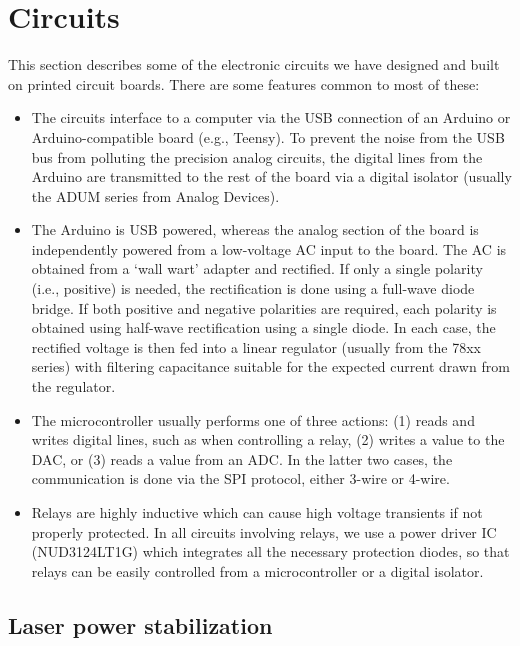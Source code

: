 \section{Circuits}

This section describes some of the electronic circuits we have designed and built
on printed circuit boards. There are some features common to most of these:

\begin{itemize}
   \item The circuits interface to a computer via the USB connection of an
      Arduino or Arduino-compatible board (e.g., Teensy). To prevent the noise
      from the USB bus from polluting the precision analog circuits, the digital
      lines from the Arduino are transmitted to the rest of the board via a
      digital isolator (usually the ADUM series from Analog Devices).
   \item The Arduino is USB powered, whereas the analog section of the board is
      independently powered from a low-voltage AC input to the board. The AC is
      obtained from a `wall wart' adapter and rectified. If only a single
      polarity (i.e., positive) is needed, the rectification is done using a
      full-wave diode bridge. If both positive and negative polarities are
      required, each polarity is obtained using half-wave rectification using a
      single diode. In each case, the rectified voltage is then fed into a
      linear regulator (usually from the 78xx series) with filtering capacitance
      suitable for the expected current drawn from the regulator.
   \item The microcontroller usually performs one of three actions: (1) reads
      and writes digital lines, such as when controlling a relay, (2) writes a
      value to the DAC, or (3) reads a value from an ADC. In the latter two
      cases, the communication is done via the SPI protocol, either 3-wire or
      4-wire.
   \item Relays are highly inductive which can cause high voltage transients if
      not properly protected. In all circuits involving relays, we use a power
      driver IC (NUD3124LT1G) which integrates all the necessary protection
      diodes, so that relays can be easily controlled from a microcontroller or
      a digital isolator.
\end{itemize}

\subsection{Laser power stabilization}
\label{app:laser_power}


